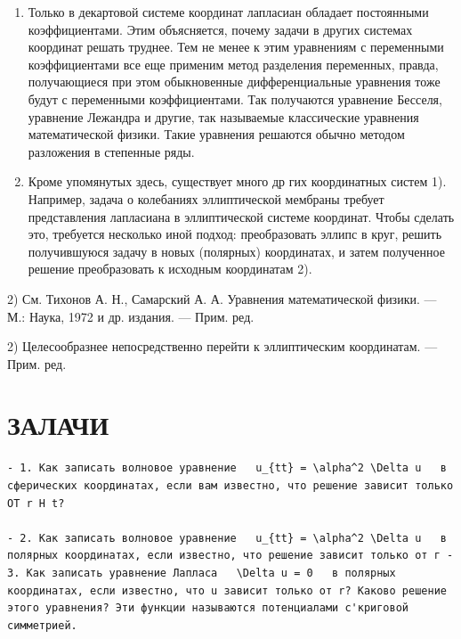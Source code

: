 \documentclass[
]{article}
\begin{document}
{{{\begin{enumerate}
\def\labelenumi{\arabic{enumi}.}
\item
  Только в декартовой системе координат лапласиан обладает постоянными
  коэффициентами. Этим объясняется, почему задачи в других системах
  координат решать труднее. Тем не менее к этим уравнениям с переменными
  коэффициентами все еще применим метод разделения переменных, правда,
  получающиеся при этом обыкновенные дифференциальные уравнения тоже
  будут с переменными коэффициентами. Так получаются уравнение Бесселя,
  уравнение Лежандра и другие, так называемые классические уравнения
  математической физики. Такие уравнения решаются обычно методом
  разложения в степенные ряды.
\item
  Кроме упомянутых здесь, существует много др гих координатных систем
  1). Например, задача о колебаниях эллиптической мембраны требует
  представления лапласиана в эллиптической системе координат. Чтобы
  сделать это, требуется несколько иной подход: преобразовать эллипс в
  круг, решить получившуюся задачу в новых (полярных) координатах, и
  затем полученное решение преобразовать к исходным координатам 2).
\end{enumerate}

2) См. Тихонов А. Н., Самарский А. А. Уравнения математической физики.
--- М.: Наука, 1972 и др. издания. --- Прим. ред.

2) Целесообразнее непосредственно перейти к эллиптическим координатам.
--- Прим. ред.

\section{ЗАЛАЧИ}\label{ux437ux430ux43bux430ux447ux438}

\begin{verbatim}
- 1. Как записать волновое уравнение   u_{tt} = \alpha^2 \Delta u   в сферических координатах, если вам известно, что решение зависит только OT r H t?

- 2. Как записать волновое уравнение   u_{tt} = \alpha^2 \Delta u   в полярных координатах, если известно, что решение зависит только от г - 3. Как записать уравнение Лапласа   \Delta u = 0   в полярных координатах, если известно, что u зависит только от r? Каково решение этого уравнения? Эти функции называются потенциалами с'криговой симметрией.
\end{verbatim}

}}}
\end{document}
